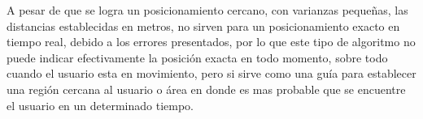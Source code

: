 A pesar de que se logra un posicionamiento cercano, con varianzas pequeñas, las distancias establecidas en metros, no sirven para un posicionamiento exacto en tiempo real, debido a los errores presentados, por lo que este tipo de algoritmo no puede indicar efectivamente la posición exacta en todo momento, sobre todo cuando el usuario esta en movimiento, pero si sirve como una guía para establecer una región cercana al usuario o área en donde es mas probable que se encuentre el usuario en un determinado tiempo.




 

